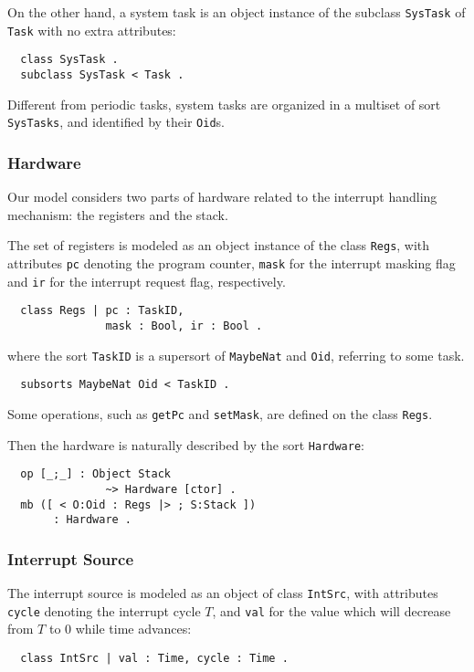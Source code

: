 \documentclass[10pt,journal,compsoc]{IEEEtran}
\begin{document}
On the other hand, a system task is an object instance of the subclass
\verb|SysTask| of \verb|Task| with no extra attributes:
\begin{verbatim}
  class SysTask .            
  subclass SysTask < Task .
\end{verbatim}
Different from periodic tasks, system tasks are organized in a
multiset of sort \verb|SysTasks|, and identified by their \verb|Oid|s.

\subsubsection{Hardware}
Our model considers two parts of hardware related to the interrupt
handling mechanism: the registers and the stack.

The set of registers is modeled as an object instance of the class
\verb|Regs|, with attributes \verb|pc| denoting the program counter,
\verb|mask| for the interrupt masking flag and \verb|ir| for the
interrupt request flag, respectively.
\begin{verbatim}
  class Regs | pc : TaskID, 
               mask : Bool, ir : Bool .
\end{verbatim}
where the sort \verb|TaskID| is a supersort of \verb|MaybeNat| and
\verb|Oid|, referring to some task.
\begin{verbatim}
  subsorts MaybeNat Oid < TaskID .
\end{verbatim}
Some operations, such as \verb|getPc| and \verb|setMask|, are defined
on the class \verb|Regs|.

Then the hardware is naturally described by the sort \verb|Hardware|:
\begin{verbatim}
  op [_;_] : Object Stack 
               ~> Hardware [ctor] .
  mb ([ < O:Oid : Regs |> ; S:Stack ]) 
       : Hardware .
\end{verbatim}

\subsubsection{Interrupt Source}
The interrupt source is modeled as an object of class \verb|IntSrc|,
with attributes \verb|cycle| denoting the interrupt cycle $T$, and
\verb|val| for the value which will decrease from $T$ to $0$ while
time advances:
\begin{verbatim}
  class IntSrc | val : Time, cycle : Time .
\end{verbatim}
\end{document}
